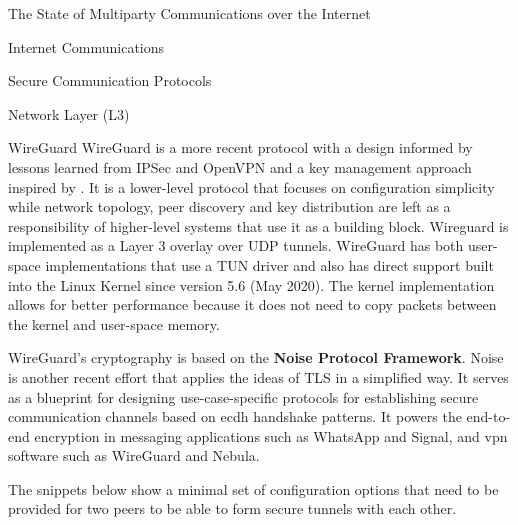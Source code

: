 \begin{frame}[fragile]{The State of Multiparty Communications over the Internet}
\begin{block}{Internet Communications}
\begin{block}{Secure Communication Protocols}
\begin{block}{Network Layer (L3)}
\begin{block}{WireGuard}
\label{thesis__020-internet.md__wireguard}
WireGuard \autocite{donenfeldWireGuardNextGeneration2017} is a more recent protocol with a design informed by lessons learned from IPSec and OpenVPN and a key management approach inspired by . It is a lower-level protocol that focuses on configuration simplicity while network topology, peer discovery and key distribution are left as a responsibility of higher-level systems that use it as a building block. Wireguard is implemented as a Layer 3 overlay over UDP tunnels. WireGuard has both user-space implementations that use a TUN driver and also has direct support built into the Linux Kernel since version 5.6 (May 2020). The kernel implementation allows for better performance because it does not need to copy packets between the kernel and user-space memory.

WireGuard's cryptography is based on the \textbf{Noise Protocol Framework}\autocite{noiseDocs}. Noise is another recent effort that applies the ideas of TLS in a simplified way. It serves as a blueprint for designing use-case-specific protocols for establishing secure communication channels based on \gls{ecdh} handshake patterns. It powers the end-to-end encryption in messaging applications such as WhatsApp and Signal, and \gls{vpn} software such as WireGuard and Nebula.
  

The snippets below show a minimal set of configuration options that need to be provided for two peers to be able to form secure tunnels with each other.

\begin{Shaded}
\begin{Highlighting}[]
\KeywordTok{[Interface]}
\OtherTok{=}
\OtherTok{=}\StringTok{ }
\OtherTok{=}

\KeywordTok{[Peer]}
\OtherTok{=}
\OtherTok{=}
\OtherTok{=}
\end{Highlighting}
\end{Shaded}

\begin{Shaded}
\begin{Highlighting}[]
\KeywordTok{[Interface]}
\OtherTok{=}
\OtherTok{=}\StringTok{ }
\OtherTok{=}


\end{Highlighting}
\end{Shaded}
\end{block}
\end{block}
\end{block}
\end{block}
\end{frame}
